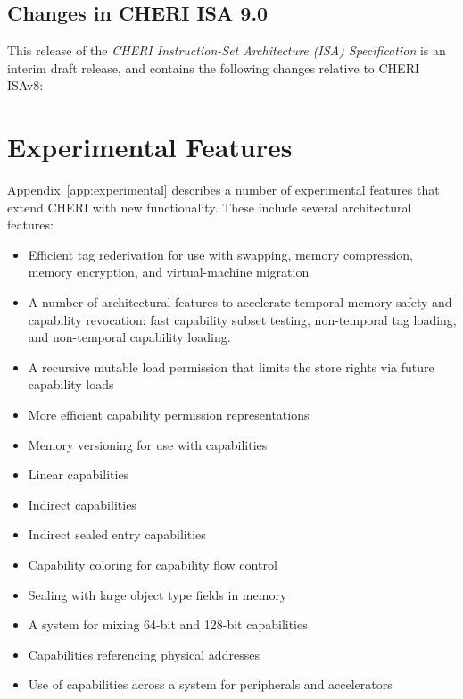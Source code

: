 \subsection{Changes in CHERI ISA 9.0}

This release of the \textit{CHERI Instruction-Set Architecture (ISA)
Specification} is an interim draft release, and contains the following
changes relative to CHERI ISAv8:



\section{Experimental Features}
\label{sec:intro:experimental}


Appendix~\ref{app:experimental} describes a number of experimental features
that extend CHERI with new functionality.
These include several architectural features:

\begin{itemize}
\item Efficient tag rederivation for use with swapping, memory compression,
  memory encryption, and virtual-machine migration
\item A number of architectural features to accelerate temporal memory safety
  and capability revocation: fast capability subset testing, non-temporal
  tag loading, and non-temporal capability loading.
\item A recursive mutable load permission that limits the store rights
  via future capability loads
\item More efficient capability permission representations
\item Memory versioning for use with capabilities
\item Linear capabilities
\item Indirect capabilities
\item Indirect sealed entry capabilities
\item Capability coloring for capability flow control
\item Sealing with large object type fields in memory
\item A system for mixing 64-bit and 128-bit capabilities
\item Capabilities referencing physical addresses
\item Use of capabilities across a system for peripherals and accelerators
\end{itemize}

